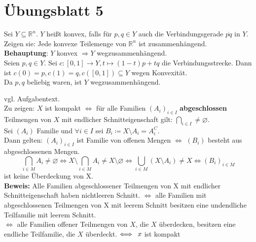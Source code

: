 % 
\section{Übungsblatt 5}

\begin{problem}[1a]
  
  Sei \( Y \subseteq \mathbb{R}^n \). \( Y \) heißt konvex, falls für \( p, q \in Y \) auch die Verbindungsgerade \( \overline{pq} \) in \( Y \). \\
  Zeigen sie: Jede konvexe Teilemenge von \( \mathbb{R}^n \) ist zusammenhängend. \\
  \textbf{Behauptung}: \( Y \) konvex \( \Rightarrow Y \) wegzusammenhängend. \\
  Seien \( p, q \in Y \). Sei \( c: [0,1] \to Y, t \mapsto (1-t)p +tq \) die Verbindungsstrecke.
  Dann ist \( c(0) = p, c(1) = q, c([0,1]) \subseteq Y \) wegen Konvexität. \\
  Da \( p,q \) beliebig waren, ist \( Y \) wegzusammenhängend. 
\end{problem}

\begin{problem}[2]	
  vgl. Aufgabentext. \\
  Zu zeigen: \( X \) ist kompakt \( \Longleftrightarrow \) für alle Familien \( {(A_i)}_{i \in I} \) \textbf{abgeschlossen}
  Teilmengen von \( X \) mit endlicher Schnitteigenschaft gilt: \( \bigcap_{i \in I} \neq \varnothing \). \\
  Sei \( (A_i) \) Familie und \( \forall i \in I \) sei \( B_i \coloneqq X \setminus A_i = A_i^{C} \). \\
  Dann gelten: 
  \( {(A_i)}_ { i \in I} \) ist Familie von offenen Mengen \( \Longleftrightarrow \) \( (B_i) \) besteht aus abgeschlossenen Mengen.
	\begin{equation*}
		\bigcap_{i \in M} A_i \neq \varnothing \Leftrightarrow X \setminus \bigcap_{i \in M} A_i \neq	X \setminus \varnothing \Leftrightarrow \bigcup_ {i \in M} (X \setminus A_i) \neq X \Longleftrightarrow {(B_i)}_{i \in M} 
	\end{equation*}
	ist keine Überdeckung von X. \\
	\textbf{Beweis:} Alle Familien abgeschlossener Teilmengen von X mit endlicher Schnitteigenschaft haben nichtleeren Schnitt. \( \Leftrightarrow \) alle Familien mit abgeschlossenen Teilmengen von X mit leerem Schnitt besitzen eine undendliche Teilfamilie mit leerem Schnitt. \\
  \( \Leftrightarrow \) alle Familien offener Teilmengen von \( X \), die \( X \) überdecken, besitzen eine endliche Teilfamilie, die \( X \) überdeckt. \( \Longleftrightarrow \enskip x \) ist kompakt
\end{problem}

